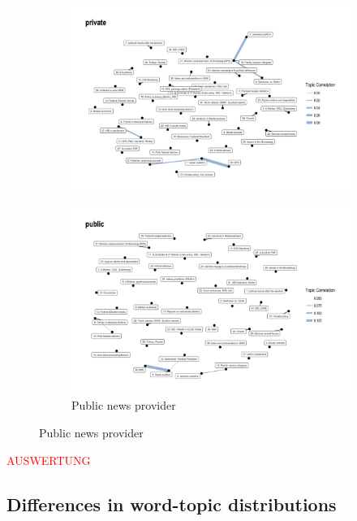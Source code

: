 \documentclass[12pt,a4paper,notitlepage]{article}
\begin{document}
\begin{figure}[H]
	\caption{Topic Correlation}
		\begin{center}
		\begin{subfigure}{.7\textwidth}
			\includegraphics[width=\textwidth]{../figs/corrplot1.png}	
		\end{subfigure}
		\begin{subfigure}{.7\textwidth}
			\includegraphics[width=\textwidth]{../figs/corrplot2}
			\caption{Public news provider}	
		\end{subfigure}
		\end{center}
	\label{fig_topic_correlations}
\end{figure}

\textcolor{red}{AUSWERTUNG}

\subsection{Differences in word-topic distributions}\label{subsection_similarity}
\end{document}
